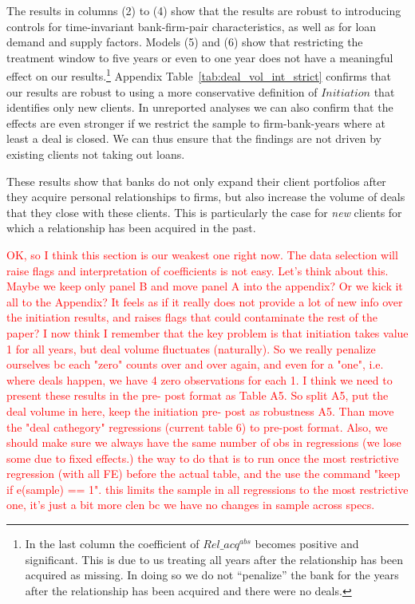 The results in columns (2) to (4) show that the results are robust to introducing controls for time-invariant bank-firm-pair characteristics, as well as for loan demand and supply factors. Models (5) and (6) show that restricting the treatment window to five years or even to one year does not have a meaningful effect on our results.\footnote{In the last column the coefficient of $Rel\_acq^{abs}$ becomes positive and significant. This is due to us treating all years after the relationship has been acquired as missing. In doing so we do not ``penalize'' the bank for the years after the relationship has been acquired and there were no deals.} Appendix Table~\ref{tab:deal_vol_int_strict} confirms that our results are robust to using a more conservative definition of $Initiation$ that identifies only new clients. In unreported analyses we can also confirm that the effects are even stronger if we restrict the sample to firm-bank-years where at least a deal is closed. We can thus ensure that the findings are not driven by existing clients not taking out loans. 

These results show that banks do not only expand their client portfolios after they acquire personal relationships to firms, but also increase the volume of deals that they close with these clients. This is particularly the case for \emph{new} clients for which a relationship has been acquired in the past.  

\textcolor{red}{OK, so I think this section is our weakest one right now. The data selection will raise flags and interpretation of coefficients is not easy. Let's think about this. Maybe we keep only panel B and move panel A into the appendix? Or we kick it all to the Appendix? It feels as if it really does not provide a lot of new info over the initiation results, and raises flags that could contaminate the rest of the paper?  I now think I remember that the key problem is that initiation takes value 1 for all years, but deal volume fluctuates (naturally). So we really penalize ourselves bc each "zero" counts over and over again, and even for a "one", i.e. where deals happen, we have 4 zero observations for each 1. I think  we need to present these results in the pre- post format as Table A5. So split A5, put the deal volume in here, keep the initiation pre- post as robustness A5. Than move the "deal cathegory" regressions (current table 6) to pre-post format. Also, we should make sure we always have the same number of obs in regressions (we lose some due to fixed effects.) the way to do that is to run once the most restrictive regression (with all FE) before the actual table, and the use the command "keep if e(sample) == 1". this limits the sample in all regressions to the most restrictive one, it's just a bit more clen bc we have no changes in sample across specs. }

